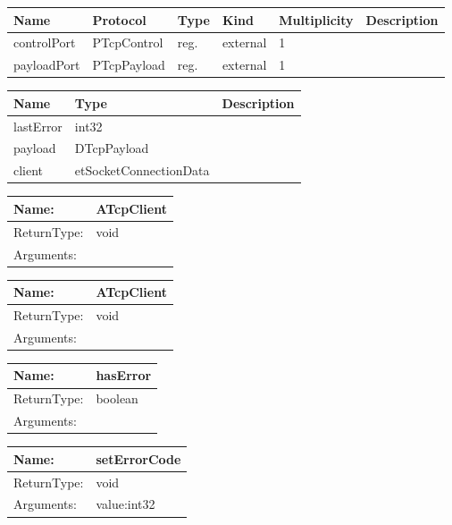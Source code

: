 

\begin{tabular}[ht]{|l|l|l|l|l|p{5cm}|}
\hline
\textbf{Name} & \textbf{Protocol} & \textbf{Type} & \textbf{Kind} & \textbf{Multiplicity} & \textbf{Description}\\
\hline
controlPort & PTcpControl & reg. & external & 1 & \\
\hline
payloadPort & PTcpPayload & reg. & external & 1 & \\
\hline
\end{tabular}


\begin{par}

\end{par}


\begin{tabular}[ht]{|l|l|p{8cm}|}
\hline
\textbf{Name} & \textbf{Type} & \textbf{Description}\\
\hline
lastError & int32 & \\
\hline
payload & DTcpPayload & \\
\hline
client & etSocketConnectionData & \\
\hline
\end{tabular}

\begin{tabular}[ht]{|l|l|}
\hline		
	Name: & ATcpClient\\
	\hline
	ReturnType: &  void\\
	\hline
	Arguments: & \\
	\hline
\end{tabular}
\newline\newline\newline
\begin{tabular}[ht]{|l|l|}
\hline		
	Name: & ATcpClient\\
	\hline
	ReturnType: &  void\\
	\hline
	Arguments: & \\
	\hline
\end{tabular}
\newline\newline\newline
\begin{tabular}[ht]{|l|l|}
\hline		
	Name: & hasError\\
	\hline
	ReturnType: &  boolean\\
	\hline
	Arguments: & \\
	\hline
\end{tabular}
\newline\newline\newline
\begin{tabular}[ht]{|l|l|}
\hline		
	Name: & setErrorCode\\
	\hline
	ReturnType: &  void\\
	\hline
	Arguments: & value:int32\\
	\hline
\end{tabular}
\newline\newline\newline
